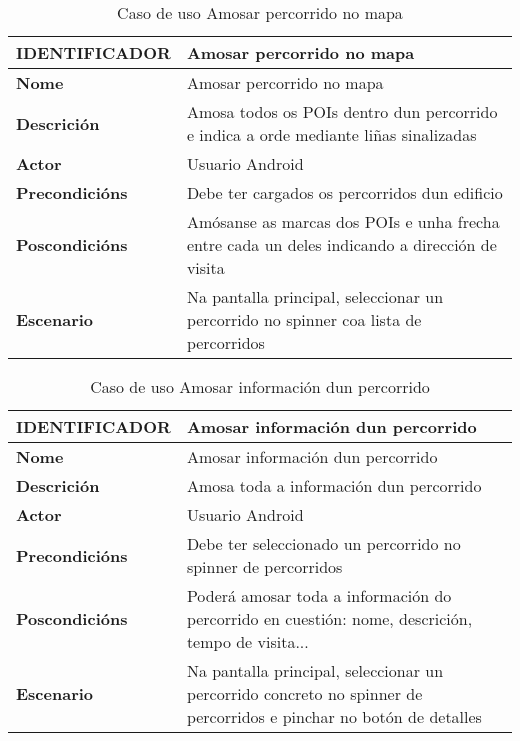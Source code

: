 \begin{table}[tbp]
	\begin{tabular}{|l|p{10cm}|}
		\hline 
		\textbf{IDENTIFICADOR}	& \textbf{Amosar percorrido no mapa} \\ 
		\hline 
		\textbf{Nome} & Amosar percorrido no mapa \\ 
		\hline 
		\textbf{Descrición} & Amosa todos os POIs dentro dun percorrido e indica a orde mediante liñas sinalizadas \\ 
		\hline 
		\textbf{Actor} & Usuario Android \\ 
		\hline 
		\textbf{Precondicións} & Debe ter cargados os percorridos dun edificio \\ 
		\hline 
		\textbf{Poscondicións} & Amósanse as marcas dos POIs e unha frecha entre cada un deles indicando a dirección de visita \\ 
		\hline 
		\textbf{Escenario} & Na pantalla principal, seleccionar un percorrido no spinner coa lista de percorridos \\ 
		\hline 
	\end{tabular}
	\caption{Caso de uso Amosar percorrido no mapa}
	\label{tab:cuAmosarPercorridoMapa}
\end{table}

\begin{table}[tbp]
	\begin{tabular}{|l|p{10cm}|}
		\hline 
		\textbf{IDENTIFICADOR}	& \textbf{Amosar información dun percorrido} \\ 
		\hline 
		\textbf{Nome} & Amosar información dun percorrido \\ 
		\hline 
		\textbf{Descrición} & Amosa toda a información dun percorrido \\ 
		\hline 
		\textbf{Actor} & Usuario Android \\ 
		\hline 
		\textbf{Precondicións} & Debe ter seleccionado un percorrido no spinner de percorridos \\ 
		\hline 
		\textbf{Poscondicións} & Poderá amosar toda a información do percorrido en cuestión: nome, descrición, tempo de visita... \\ 
		\hline 
		\textbf{Escenario} & Na pantalla principal, seleccionar un percorrido concreto no spinner de percorridos e pinchar no botón de detalles \\ 
		\hline 
	\end{tabular}
	\caption{Caso de uso Amosar información dun percorrido}
	\label{tab:cuAmosarPercorrido}
\end{table}

